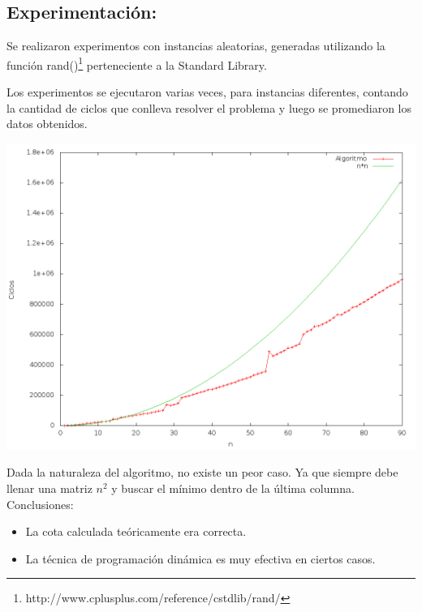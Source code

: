 \subsection{Experimentación:}

Se realizaron experimentos con instancias aleatorias, generadas utilizando la función rand()\footnote{http://www.cplusplus.com/reference/cstdlib/rand/}  perteneciente a la Standard Library.

Los experimentos se ejecutaron varias veces, para instancias diferentes, contando la cantidad de ciclos que conlleva resolver el problema y luego se promediaron los datos obtenidos.

\begin{center}
\includegraphics[scale=0.4]{../graficador/graficoAleatoriosEj1.png} 
\end{center}

Dada la naturaleza del algoritmo, no existe un peor caso. Ya que siempre debe llenar una matriz $n^{2}$ y buscar el mínimo dentro de la última columna.\\

Conclusiones:
\begin{itemize}
\item La cota calculada teóricamente era correcta.
\item La técnica de programación dinámica es muy efectiva en ciertos casos.
\end{itemize}